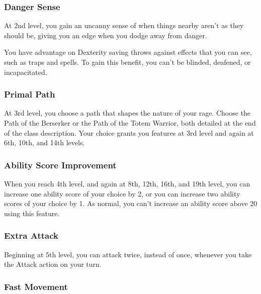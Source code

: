 \hypertarget{danger-sense}{%
\subsubsection{Danger Sense}\label{danger-sense}}

At 2nd level, you gain an uncanny sense of when things nearby aren't as
they should be, giving you an edge when you dodge away from danger.

You have advantage on Dexterity saving throws against effects that you
can see, such as traps and spells. To gain this benefit, you can't be
blinded, deafened, or incapacitated.

\hypertarget{primal-path}{%
\subsubsection{Primal Path}\label{primal-path}}

At 3rd level, you choose a path that shapes the nature of your rage.
Choose the Path of the Berserker or the Path of the Totem Warrior, both
detailed at the end of the class description. Your choice grants you
features at 3rd level and again at 6th, 10th, and 14th levels.

\hypertarget{ability-score-improvement}{%
\subsubsection{Ability Score
Improvement}\label{ability-score-improvement}}

When you reach 4th level, and again at 8th, 12th, 16th, and 19th level,
you can increase one ability score of your choice by 2, or you can
increase two ability scores of your choice by 1. As normal, you can't
increase an ability score above 20 using this feature.

\hypertarget{extra-attack}{%
\subsubsection{Extra Attack}\label{extra-attack}}

Beginning at 5th level, you can attack twice, instead of once, whenever
you take the Attack action on your turn.

\hypertarget{fast-movement}{%
\subsubsection{Fast Movement}\label{fast-movement}}

